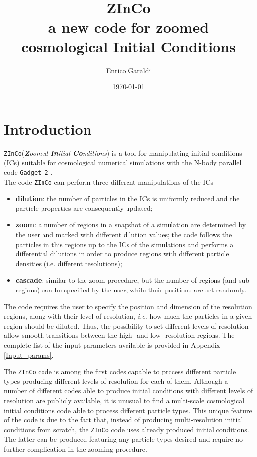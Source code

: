 \documentclass[11pt,a4paper,titlepage]{article}
\author{Enrico Garaldi}
\date{\today}
\title{\textbf{\Huge ZInCo} \\ a new code for zoomed cosmological Initial Conditions}
\newcommand{\ie}{\emph{i.e.}\xspace}
\newcommand{\zinco}{\texttt{ZInCo}\xspace}
\newcommand{\gadget}{\texttt{Gadget-2}\xspace}
\begin{document}
\maketitle

\section{Introduction}
\zinco (\emph{\textbf{Z}oomed \textbf{In}itial \textbf{Co}nditions}) is a tool for manipulating initial conditions (ICs) suitable for cosmological numerical simulations with the N-body parallel code \gadget \cite{GADGET-2} \cite{GADGET}.\\
The code \zinco can perform three different manipulations of the ICs:
\begin{itemize}
\item \textbf{dilution}: the number of particles in the ICs is uniformly reduced and the particle properties are consequently updated;
\item \textbf{zoom}: a number of regions in a snapshot of a simulation are determined by the user and marked with different dilution values; the code follows the particles in this regions up to the ICs of the simulations and performs a differential dilutions in order to produce regions with different particle densities (i.e. different resolutions);
\item \textbf{cascade}: similar to the zoom procedure, but the number of regions (and sub-regions) can be specified by the user, while their positions are set randomly.
\end{itemize}

The code requires the user to specify the position and dimension of the resolution regions, along with their level of resolution, \ie how much the particles in a given region should be diluted. Thus, the possibility to set different levels of resolution allow smooth transitions between the high- and low- resolution regions. The complete list of the input parameters available is provided in Appendix \ref{Input_params}.

The \zinco code is among the first codes capable to process different particle types producing different levels of resolution for each of them. Although a number of different codes able to produce initial conditions with different levels of resolution are publicly available, it is unusual to find a multi-scale cosmological initial conditions code able to process different particle types. This unique feature of the code is due to the fact that, instead of producing multi-resolution initial conditions from scratch, the \zinco code uses already produced initial conditions. The latter can be produced featuring any particle types desired and require no further complication in the zooming procedure. 
\end{document}
